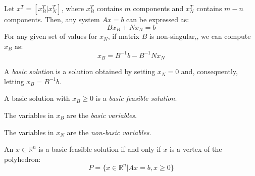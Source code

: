 \documentclass[12pt, a4paper]{report}
\begin{document}
    Let $x^T=\left[x_B^T | x_N^T\right]$, where $x_B^T$ contains  $m$ components and $x_N^T$ contains  $m-n$ components. 
    Then, any system $Ax = b$ can be expressed as:
    \[Bx_B+Nx_N=b\]
    For any given set of values for $x_N$, if matrix  $B$ is non-singular,, we can compute $x_B$ as:
    \[x_B=B^{-1}b-B^{-1}Nx_N\]
    \begin{definition}
        A \emph{basic solution} is a solution obtained by setting $x_N=0$ and, consequently, letting $x_B=B^{-1}b$.

        A basic solution with $x_B \geq 0$ is a \emph{basic feasible solution}.

        The variables in $x_B$ are the \emph{basic variables}.
        
        The variables in $x_N$ are the \emph{non-basic variables}.
    \end{definition}
    \begin{theorem}
        An $x \in \mathbb{R}^n$ is a basic feasible solution if and only if $x$ is a vertex of the polyhedron:
        \[P=\{x \in \mathbb{R}^n|Ax=b,x \geq 0\}\]
    \end{theorem}
\end{document}
